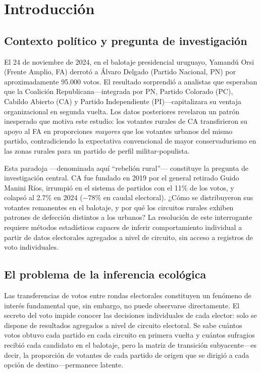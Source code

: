 
\section{Introducción}
\label{sec:introduccion}

\subsection{Contexto político y pregunta de investigación}

El 24 de noviembre de 2024, en el balotaje presidencial uruguayo, Yamandú Orsi (Frente Amplio, FA) derrotó a Álvaro Delgado (Partido Nacional, PN) por aproximadamente 95.000 votos. El resultado sorprendió a analistas que esperaban que la Coalición Republicana---integrada por PN, Partido Colorado (PC), Cabildo Abierto (CA) y Partido Independiente (PI)---capitalizara su ventaja organizacional en segunda vuelta. Los datos posteriores revelaron un patrón inesperado que motiva este estudio: los votantes rurales de CA transfirieron su apoyo al FA en proporciones \textit{mayores} que los votantes urbanos del mismo partido, contradiciendo la expectativa convencional de mayor conservadurismo en las zonas rurales para un partido de perfil militar-populista.

Esta paradoja ---denominada aquí ``rebelión rural''--- constituye la pregunta de investigación central. CA fue fundado en 2019 por el general retirado Guido Manini Ríos, irrumpió en el sistema de partidos con el 11\% de los votos, y colapsó al 2.7\% en 2024 ($-$78\% en caudal electoral). ¿Cómo se distribuyeron sus votantes remanentes en el balotaje, y por qué los circuitos rurales exhiben patrones de defección distintos a los urbanos? La resolución de este interrogante requiere métodos estadísticos capaces de inferir comportamiento individual a partir de datos electorales agregados a nivel de circuito, sin acceso a registros de voto individuales.

\subsection{El problema de la inferencia ecológica}

Las transferencias de votos entre rondas electorales constituyen un fenómeno de interés fundamental que, sin embargo, no puede observarse directamente. El secreto del voto impide conocer las decisiones individuales de cada elector: solo se dispone de resultados agregados a nivel de circuito electoral. Se sabe cuántos votos obtuvo cada partido en cada circuito en primera vuelta y cuántos sufragios recibió cada candidato en el balotaje, pero la matriz de transición subyacente---es decir, la proporción de votantes de cada partido de origen que se dirigió a cada opción de destino---permanece latente.

